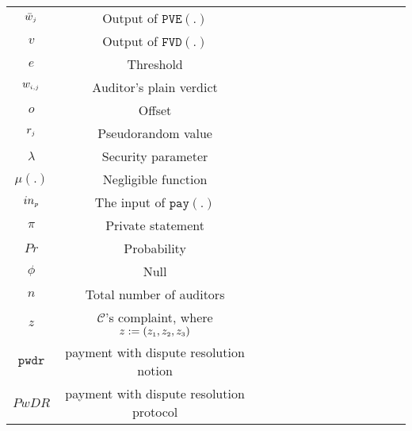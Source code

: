 \begin{table*}[!htb]
\begin{scriptsize}
\begin{center}
{{\begin{tabular}{|c|c|c|c|c|c|c|c|c|c|c|c|c|c|}
%
\cellcolor{white!20}\scriptsize$\bar{w}_{\scriptscriptstyle j}$ &\cellcolor{white!20}\scriptsize  Output of $\mathtt{PVE}(.)$\\ 
%
\cellcolor{gray!20}\scriptsize$v$ &\cellcolor{gray!20}\scriptsize  Output of $\mathtt{FVD}(.)$\\ 
%
\cellcolor{white!20}\scriptsize$e$ &\cellcolor{white!20}\scriptsize  Threshold\\ 
%            
 \cellcolor{gray!20}\scriptsize$w_{\scriptscriptstyle i,j}$ &\cellcolor{gray!20}\scriptsize  Auditor's plain verdict\\ 
%     
\cellcolor{white!20}\scriptsize$o$ &\cellcolor{white!20}\scriptsize  Offset\\  
  \cellcolor{gray!20}\scriptsize$r_{\scriptscriptstyle j}$ &\cellcolor{gray!20}\scriptsize  Pseudorandom value\\   
\cellcolor{white!20}\scriptsize$\lambda$ &\cellcolor{white!20}\scriptsize Security parameter\\  
%
\cellcolor{gray!20}\scriptsize$\mu(.)$ &\cellcolor{gray!20}\scriptsize Negligible function\\  


\cellcolor{white!20}\scriptsize$in_{\scriptscriptstyle p}$ &\cellcolor{white!20}\scriptsize The input of $\mathtt{pay}(.)$\\                    
%
\cellcolor{gray!20}\scriptsize$\pi$ &\cellcolor{gray!20}\scriptsize Private statement\\        
  \cellcolor{white!20}\scriptsize$Pr$ &\cellcolor{white!20}\scriptsize Probability\\   

%
\cellcolor{gray!20}\scriptsize$\phi$ &\cellcolor{gray!20}\scriptsize  Null\\ 
%
\cellcolor{white!20}\scriptsize$n$ &\cellcolor{white!20}\scriptsize  Total number of auditors\\  
%           
\cellcolor{gray!20}\scriptsize$z$ &\cellcolor{gray!20}\scriptsize  $\mathcal{C}$'s complaint, where $z:=(z_{\scriptscriptstyle 1}, z_{\scriptscriptstyle 2}, z_{\scriptscriptstyle 3})$\\ 
%
\cellcolor{white!20}\scriptsize$\mathtt{pwdr}$ &\cellcolor{white!20}\scriptsize  payment with dispute resolution notion\\ 
%
\cellcolor{gray!20}\scriptsize$PwDR$ &\cellcolor{gray!20}\scriptsize  payment with dispute resolution protocol\\ 
\hline 


      

           
              
\end{tabular}\label{table:notation-table}
%
}}
\end{center}
\end{scriptsize}
\end{table*}








